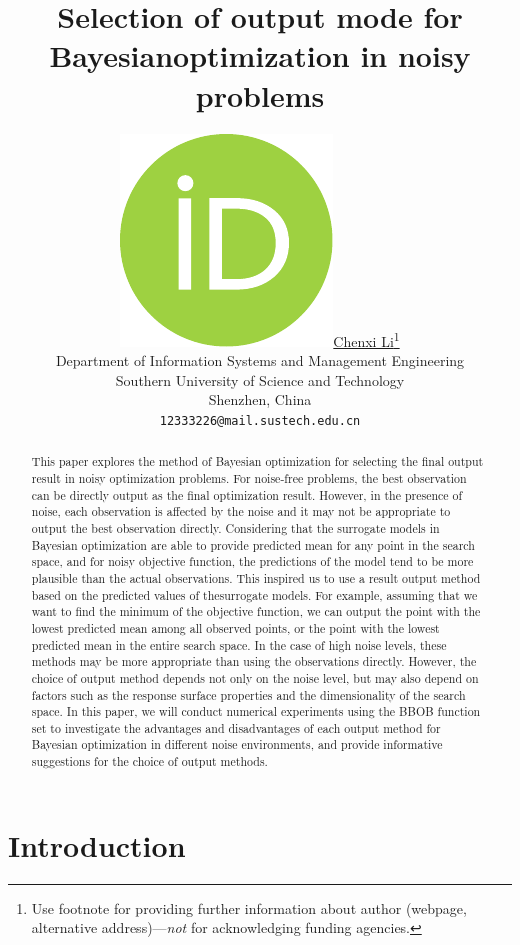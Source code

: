 \documentclass{article}
\title{Selection of output mode for Bayesianoptimization in noisy problems}
\author{ \href{https://orcid.org/0000-0000-0000-0000}{\includegraphics[scale=0.06]{orcid.pdf}\hspace{1mm}Chenxi Li}\thanks{Use footnote for providing further
		information about author (webpage, alternative
		address)---\emph{not} for acknowledging funding agencies.} \\
	Department of Information Systems and Management Engineering\\
	Southern University of Science and Technology\\
	Shenzhen, China\\
	\texttt{12333226@mail.sustech.edu.cn} \\
}
\begin{document}
\maketitle

\begin{abstract}
	\hspace{2em}This paper explores the method of Bayesian optimization for selecting the final output result in noisy optimization problems. For noise-free problems, the best observation can be directly output as the final optimization result. However, in the presence of noise, each observation is affected by the noise and it may not be appropriate to output the best observation directly. Considering that the surrogate models in Bayesian optimization are able to provide predicted mean for any point in the search space, and for noisy objective function, the predictions of the model tend to be more plausible than the actual observations. This inspired us to use a result output method based on the predicted values of thesurrogate models. For example, assuming that we want to find the minimum of the objective function, we can output the point with the lowest predicted mean among all observed points, or the point with the lowest predicted mean in the entire search space. In the case of high noise levels, these methods may be more appropriate than using the observations directly. However, the choice of output method depends not only on the noise level, but may also depend on factors such as the response surface properties and the dimensionality of the search space. In this paper, we will conduct numerical experiments using the BBOB function set to investigate the advantages and disadvantages of each output method for Bayesian optimization in different noise environments, and provide informative suggestions for the choice of output methods.

\end{abstract}





\section{Introduction}
\end{document}
